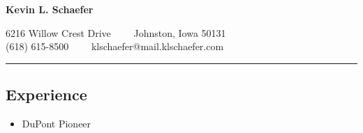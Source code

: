 \documentclass[10pt,letterpaper]{article}
\begin{document}
\begin{center}
	{\LARGE \textbf{Kevin L. Schaefer}}

	6216 Willow Crest Drive\ \ \textbullet
	\ \ Johnston, Iowa 50131
	\\
	(618) 615-8500\ \ \textbullet
	\ \ klschaefer@mail.klschaefer.com
\end{center}

\hrule
\subsection*{Experience}
\begin{itemize}
	\item
	DuPont Pioneer
\end{itemize}
\end{document}

